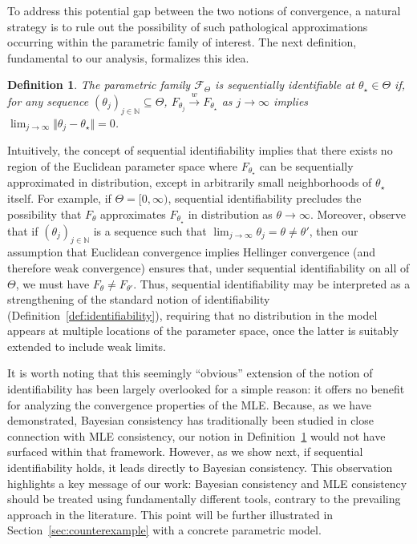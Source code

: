 \documentclass[11pt,twoside]{article}
\newcommand{\wc}{\overset{w}{\longrightarrow}}
\newtheorem{definition}{Definition}
\def\NN{\mathbb{N}}
\begin{document}
To address this potential gap between the two notions of convergence, a natural strategy is to rule out the possibility of such pathological approximations occurring within the parametric family of interest. The next definition, fundamental to our analysis, formalizes this idea.



\begin{definition}\label{def:sequential_identifiability}
    The parametric family $\mathcal F_\Theta$ is sequentially identifiable at $\theta_\star\in\Theta$ if, for any sequence $(\theta_j)_{j\in\NN}\subseteq \Theta$, $F_{\theta_j}\wc F_{\theta_\star}$ as $j\to\infty$ implies $\lim_{j\to\infty}\Vert\theta_j-\theta_\star\Vert = 0$.
\end{definition}



Intuitively, the concept of sequential identifiability implies that there exists no region of the Euclidean parameter space where $F_{\theta_\star}$ can be sequentially approximated in distribution, except in arbitrarily small neighborhoods of $\theta_\star$ itself. For example, if $\Theta = [0,\infty)$, sequential identifiability precludes the possibility that $F_\theta$ approximates $F_{\theta_\star}$ in distribution as $\theta \to \infty$. Moreover, observe that if $(\theta_j)_{j\in\NN}$ is a sequence such that $\lim_{j\to\infty} \theta_j = \theta \neq \theta'$, then our assumption that Euclidean convergence implies Hellinger convergence (and therefore weak convergence) ensures that, under sequential identifiability on all of $\Theta$, we must have $F_{\theta} \neq F_{\theta'}$. Thus, sequential identifiability may be interpreted as a strengthening of the standard notion of identifiability (Definition~\ref{def:identifiability}), requiring that no distribution in the model appears at multiple locations of the parameter space, once the latter is suitably extended to include weak limits.

It is worth noting that this seemingly “obvious” extension of the notion of identifiability has been largely overlooked for a simple reason: it offers no benefit for analyzing the convergence properties of the MLE. Because, as we have demonstrated, Bayesian consistency has traditionally been studied in close connection with MLE consistency, our notion in Definition~\ref{def:sequential_identifiability} would not have surfaced within that framework. However, as we show next, if sequential identifiability holds, it leads directly to Bayesian consistency. This observation highlights a key message of our work: Bayesian consistency and MLE consistency should be treated using fundamentally different tools, contrary to the prevailing approach in the literature. This point will be further illustrated in Section~\ref{sec:counterexample} with a concrete parametric model.
\end{document}

